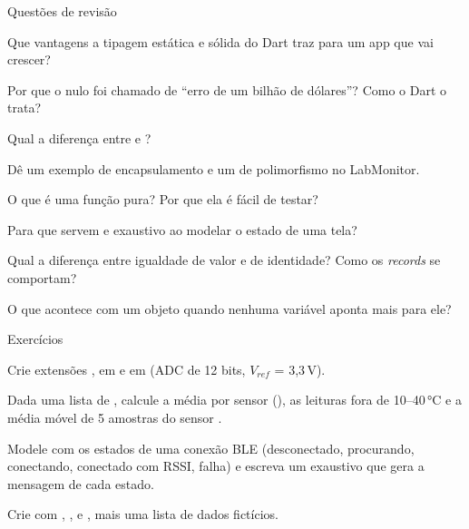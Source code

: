 \documentclass[aspectratio=169,10pt]{beamer}
\begin{document}
\begin{frame}{Questões de revisão}
  \begin{questoes}
    \item Que vantagens a tipagem estática e sólida do Dart traz para um app que vai crescer?
    \item Por que o nulo foi chamado de ``erro de um bilhão de dólares''? Como o Dart o trata?
    \item Qual a diferença entre  e ?
    \item Dê um exemplo de encapsulamento e um de polimorfismo no LabMonitor.
    \item O que é uma função pura? Por que ela é fácil de testar?
    \item Para que servem  e  exaustivo ao modelar o estado de uma tela?
    \item Qual a diferença entre igualdade de valor e de identidade? Como os \emph{records} se comportam?
    \item O que acontece com um objeto quando nenhuma variável aponta mais para ele?
  \end{questoes}
\end{frame}

\begin{frame}{Exercícios}
  \begin{exercicio}
    Crie extensões ,  em  e  em  (ADC de 12 bits, $V_{ref}$ = 3,3\,V).
  \end{exercicio}
  \begin{exercicio}
    Dada uma lista de , calcule a média por sensor (), as leituras fora de 10--40\,°C e a média móvel de 5 amostras do sensor .
  \end{exercicio}
  \begin{exercicio}
    Modele com  os estados de uma conexão BLE (desconectado, procurando, conectando, conectado com RSSI, falha) e escreva um  exaustivo que gera a mensagem de cada estado.
  \end{exercicio}
  \begin{projeto}
    Crie  com , ,  e , mais uma lista de dados fictícios.
  \end{projeto}
\end{frame}
\end{document}
